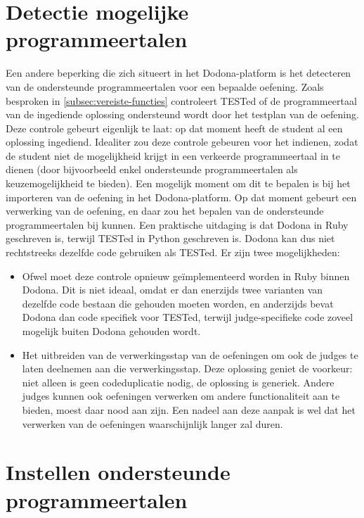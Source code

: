 \section{Detectie mogelijke programmeertalen}\label{sec:detectie-mogelijke-programmeertalen}

Een andere beperking die zich situeert in het Dodona-platform is het detecteren van de ondersteunde programmeertalen voor een bepaalde oefening.
Zoals besproken in \cref{subsec:vereiste-functies} controleert TESTed of de programmeertaal van de ingediende oplossing ondersteund wordt door het testplan van de oefening.
Deze controle gebeurt eigenlijk te laat: op dat moment heeft de student al een oplossing ingediend.
Idealiter zou deze controle gebeuren voor het indienen, zodat de student niet de mogelijkheid krijgt in een verkeerde programmeertaal in te dienen (door bijvoorbeeld enkel ondersteunde programmeertalen als keuzemogelijkheid te bieden).
Een mogelijk moment om dit te bepalen is bij het importeren van de oefening in het Dodona-platform.
Op dat moment gebeurt een verwerking van de oefening, en daar zou het bepalen van de ondersteunde programmeertalen bij kunnen.
Een praktische uitdaging is dat Dodona in Ruby geschreven is, terwijl TESTed in Python geschreven is.
Dodona kan dus niet rechtstreeks dezelfde code gebruiken als TESTed.
Er zijn twee mogelijkheden:
\begin{itemize}
    \item Ofwel moet deze controle opnieuw geïmplementeerd worden in Ruby binnen Dodona.
    Dit is niet ideaal, omdat er dan enerzijds twee varianten van dezelfde code bestaan die  gehouden moeten worden, en anderzijds bevat Dodona dan code specifiek voor TESTed, terwijl judge-specifieke code zoveel mogelijk buiten Dodona gehouden wordt.
    \item Het uitbreiden van de verwerkingsstap van de oefeningen om ook de judges te laten deelnemen aan die verwerkingsstap.
    Deze oplossing geniet de voorkeur: niet alleen is geen codeduplicatie nodig, de oplossing is generiek.
    Andere judges kunnen ook oefeningen verwerken om andere functionaliteit aan te bieden, moest daar nood aan zijn.
    Een nadeel aan deze aanpak is wel dat het verwerken van de oefeningen waarschijnlijk langer zal duren.
\end{itemize}

\section{Instellen ondersteunde programmeertalen}\label{sec:instellen-ondersteunde-programmeertalen}

